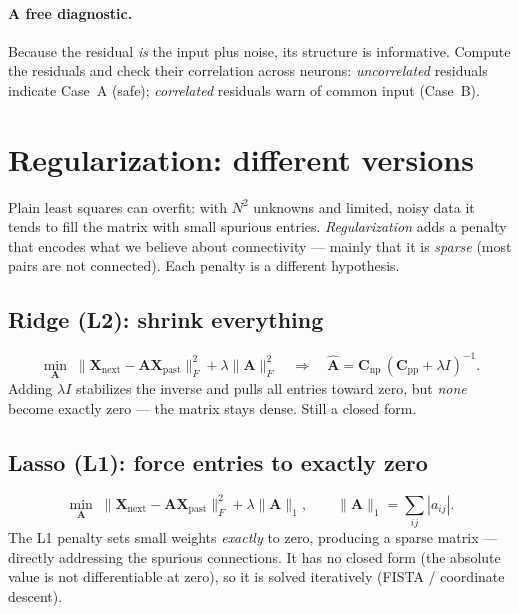 \documentclass[11pt,a4paper]{article}
\newcommand{\Amat}{\mathbf{A}}
\newcommand{\Xp}{\mathbf{X}_{\text{past}}}
\newcommand{\Xn}{\mathbf{X}_{\text{next}}}
\begin{document}
\paragraph{A free diagnostic.}
Because the residual \emph{is} the input plus noise, its structure is
informative. Compute the residuals and check their correlation across neurons:
\emph{uncorrelated} residuals indicate Case~A (safe); \emph{correlated} residuals
warn of common input (Case~B).

\section{Regularization: different versions}
\label{sec:reg}

Plain least squares can overfit: with $N^2$ unknowns and limited, noisy data it
tends to fill the matrix with small spurious entries. \emph{Regularization} adds
a penalty that encodes what we believe about connectivity --- mainly that it is
\emph{sparse} (most pairs are not connected). Each penalty is a different
hypothesis.

\subsection{Ridge (L2): shrink everything}
\begin{equation}
\min_{\Amat}\;\|\Xn-\Amat\Xp\|_F^2 + \lambda\|\Amat\|_F^2
\quad\Longrightarrow\quad
\widehat{\Amat}=\mathbf{C}_{\text{np}}\,(\mathbf{C}_{\text{pp}}+\lambda I)^{-1}.
\end{equation}
Adding $\lambda I$ stabilizes the inverse and pulls all entries toward zero, but
\emph{none} become exactly zero --- the matrix stays dense. Still a closed form.

\subsection{Lasso (L1): force entries to exactly zero}
\begin{equation}
\min_{\Amat}\;\|\Xn-\Amat\Xp\|_F^2 + \lambda\|\Amat\|_1 ,
\qquad \|\Amat\|_1=\sum_{ij}|a_{ij}| .
\end{equation}
The L1 penalty sets small weights \emph{exactly} to zero, producing a sparse
matrix --- directly addressing the spurious connections. It has no closed form
(the absolute value is not differentiable at zero), so it is solved iteratively
(FISTA / coordinate descent).
\end{document}
